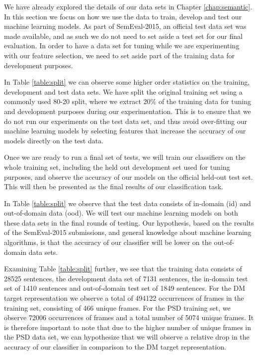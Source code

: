 We have already explored the details of our data sets in Chapter \ref{chap:semantic}. In this section we focus on how we use the data to train, develop and test our machine learning models. As part of SemEval-2015, an official test data set was made available, and as such we do not need to set aside a test set for our final evaluation. In order to have a data set for tuning while we are experimenting with our feature selection, we need to set aside part of the training data for development purposes.

In Table \ref{table:split} we can observe some higher order statistics on the training, development and test data sets. We have split the original training set using a commonly used 80-20 split, where we extract 20\% of the training data for tuning and development purposes during our experimentation. This is to ensure that we do not run our experiments on the test data set, and thus avoid over-fitting our machine learning models by selecting features that increase the accuracy of our models directly on the test data.

Once we are ready to run a final set of tests, we will train our classifiers on the whole training set, including the held out development set used for tuning purposes, and observe the accuracy of our models on the official held-out test set. This will then be presented as the final results of our classification task.

In Table \ref{table:split} we observe that the test data consists of in-domain (id) and out-of-domain data (ood). We will test our machine learning models on both these data sets in the final rounds of testing. Our hypothesis, based on the results of the SemEval-2015 submissions, and general knowledge about machine learning algorithms, is that the accuracy of our classifier will be lower on the out-of-domain data sets.

Examining Table \ref{table:split} further, we see that the training data consists of 28525 sentences, the development data set of 7131 sentences, the in-domain test set of 1410 sentences and out-of-domain test set of 1849 sentences. For the DM target representation we observe a total of 494122 occurrences of frames in the training set, consisting of 466 unique frames. For the PSD training set, we observe 72006 occurrences of frames and a total number of 5074 unique frames. It is therefore important to note that due to the higher number of unique frames in the PSD data set, we can hypothesize that we will observe a relative drop in the accuracy of our classifier in comparison to the DM target representation.

